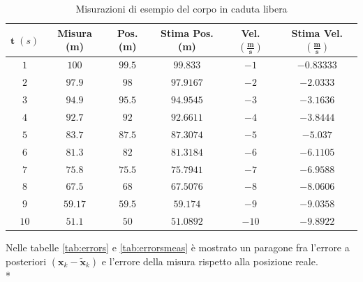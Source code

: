 \begin{table}[h]
	\begin{tabular}{|c|c|c|c|c|c|}
		\hline 
		$\mathbf{t}\;(s)$ & \textbf{Misura (m)} & \textbf{Pos.(m)} & \textbf{Stima Pos. (m)} & \textbf{Vel.} $\mathbf{\left(\frac{m}{s}\right)}$ & \textbf{Stima Vel.} $\mathbf{\left(\frac{m}{s}\right)}$ \\ 
		\hline 
		$1$ & $100$ & $99.5$ & $99.833$ & $-1$ & $-0.83333$ \\ 
		\hline 
		$2$ & $97.9$ & $98$ & $97.9167$ & $-2$ & $-2.0333$ \\ 
		\hline 
		$3$ & $94.9$ & $95.5$ & $94.9545$ & $-3$ & $-3.1636$ \\ 
		\hline 
		$4$ & $92.7$ & $92$ & $92.6611$ & $-4$ & $-3.8444$ \\ 
		\hline 
		$5$ & $83.7$ & $87.5$ & $87.3074$ & $-5$ & $-5.037$ \\ 
		\hline 
		$6$ & $81.3$ & $82$ & $81.3184$ & $-6$ & $-6.1105$ \\ 
		\hline 
		$7$ & $75.8$ & $75.5$ & $75.7941$ & $-7$ & $-6.9588$ \\ 
		\hline 
		$8$ & $67.5$ & $68$ & $67.5076$ & $-8$ & $-8.0606$ \\ 
		\hline 
		$9$ & $59.17$ & $59.5$ & $59.174$ & $-9$ & $-9.0358$ \\ 
		\hline 
		$10$ & $51.1$ & $50$ & $51.0892$ & $-10$ & $-9.8922$ \\ 
		\hline 
	\end{tabular} 
	\caption{Misurazioni di esempio del corpo in caduta libera}
	\label{tab:syntex}
\end{table}
Nelle tabelle \ref{tab:errors} e \ref{tab:errorsmeas} \`e mostrato un paragone fra l'errore a posteriori $(\mathbf x_k - \mathbf{\tilde{x}}_k)$ e l'errore della misura rispetto alla posizione reale.\\*
